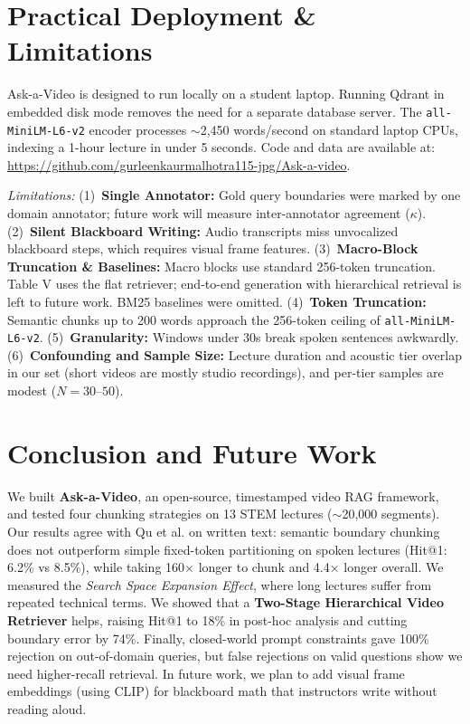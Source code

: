 \documentclass[conference]{IEEEtran}
\begin{document}
\section{Practical Deployment \& Limitations}
\label{sec:limitations}
Ask-a-Video is designed to run locally on a student laptop. Running Qdrant in embedded disk mode removes the need for a separate database server. The \texttt{all-MiniLM-L6-v2} encoder processes $\sim$2,450 words/second on standard laptop CPUs, indexing a 1-hour lecture in under 5 seconds. Code and data are available at: \url{https://github.com/gurleenkaurmalhotra115-jpg/Ask-a-video}.

\textit{Limitations:} (1)~\textbf{Single Annotator:} Gold query boundaries were marked by one domain annotator; future work will measure inter-annotator agreement ($\kappa$). (2)~\textbf{Silent Blackboard Writing:} Audio transcripts miss unvocalized blackboard steps, which requires visual frame features. (3)~\textbf{Macro-Block Truncation \& Baselines:} Macro blocks use standard 256-token truncation. Table V uses the flat retriever; end-to-end generation with hierarchical retrieval is left to future work. BM25 baselines were omitted. (4)~\textbf{Token Truncation:} Semantic chunks up to 200 words approach the 256-token ceiling of \texttt{all-MiniLM-L6-v2}. (5)~\textbf{Granularity:} Windows under 30s break spoken sentences awkwardly. (6)~\textbf{Confounding and Sample Size:} Lecture duration and acoustic tier overlap in our set (short videos are mostly studio recordings), and per-tier samples are modest ($N = 30$--$50$).

\section{Conclusion and Future Work}
We built \textbf{Ask-a-Video}, an open-source, timestamped video RAG framework, and tested four chunking strategies on 13 STEM lectures ($\sim$20,000 segments). Our results agree with Qu et al. on written text: semantic boundary chunking does not outperform simple fixed-token partitioning on spoken lectures (Hit@1: 6.2\% vs 8.5\%), while taking 160$\times$ longer to chunk and 4.4$\times$ longer overall. We measured the \textit{Search Space Expansion Effect}, where long lectures suffer from repeated technical terms. We showed that a \textbf{Two-Stage Hierarchical Video Retriever} helps, raising Hit@1 to 18\% in post-hoc analysis and cutting boundary error by 74\%. Finally, closed-world prompt constraints gave 100\% rejection on out-of-domain queries, but false rejections on valid questions show we need higher-recall retrieval. In future work, we plan to add visual frame embeddings (using CLIP) for blackboard math that instructors write without reading aloud.
\end{document}
